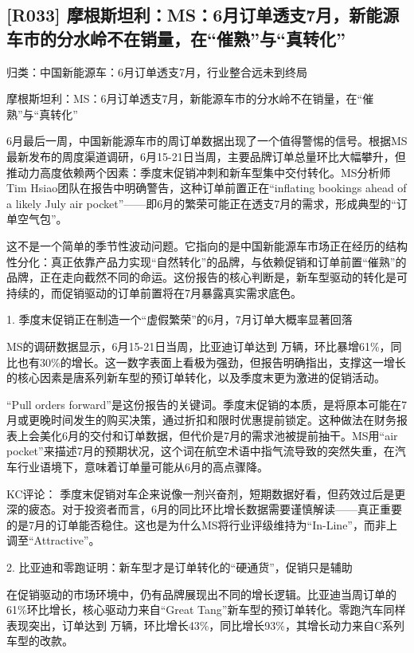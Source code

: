 \documentclass[11pt]{ctexart}
\begin{document}
\subsection{[R033] 摩根斯坦利：MS：6月订单透支7月，新能源车市的分水岭不在销量，在“催熟”与“真转化”}
{\small\color{refgray}归类：中国新能源车：6月订单透支7月，行业整合远未到终局}

摩根斯坦利：MS：6月订单透支7月，新能源车市的分水岭不在销量，在“催熟”与“真转化”

6月最后一周，中国新能源车市的周订单数据出现了一个值得警惕的信号。根据MS最新发布的周度渠道调研，6月15-21日当周，主要品牌订单总量环比大幅攀升，但推动力高度依赖两个因素：季度末促销冲刺和新车型集中交付转化。MS分析师Tim Hsiao团队在报告中明确警告，这种订单前置正在“inflating bookings ahead of a likely July air pocket”——即6月的繁荣可能正在透支7月的需求，形成典型的“订单空气包”。

这不是一个简单的季节性波动问题。它指向的是中国新能源车市场正在经历的结构性分化：真正依靠产品力实现“自然转化”的品牌，与依赖促销和订单前置“催熟”的品牌，正在走向截然不同的命运。这份报告的核心判断是，新车型驱动的转化是可持续的，而促销驱动的订单前置将在7月暴露真实需求底色。

1. 季度末促销正在制造一个“虚假繁荣”的6月，7月订单大概率显著回落

MS的调研数据显示，6月15-21日当周，比亚迪订单达到 万辆，环比暴增61\%，同比也有30\%的增长。这一数字表面上看极为强劲，但报告明确指出，支撑这一增长的核心因素是唐系列新车型的预订单转化，以及季度末更为激进的促销活动。

“Pull orders forward”是这份报告的关键词。季度末促销的本质，是将原本可能在7月或更晚时间发生的购买决策，通过折扣和限时优惠提前锁定。这种做法在财务报表上会美化6月的交付和订单数据，但代价是7月的需求池被提前抽干。MS用“air pocket”来描述7月的预期状况，这个词在航空术语中指气流导致的突然失重，在汽车行业语境下，意味着订单量可能从6月的高点骤降。

KC评论： 季度末促销对车企来说像一剂兴奋剂，短期数据好看，但药效过后是更深的疲态。对于投资者而言，6月的同比环比增长数据需要谨慎解读——真正重要的是7月的订单能否稳住。这也是为什么MS将行业评级维持为“In-Line”，而非上调至“Attractive”。

2. 比亚迪和零跑证明：新车型才是订单转化的“硬通货”，促销只是辅助

在促销驱动的市场环境中，仍有品牌展现出不同的增长逻辑。比亚迪当周订单的61\%环比增长，核心驱动力来自“Great Tang”新车型的预订单转化。零跑汽车同样表现突出，订单达到 万辆，环比增长43\%，同比增长93\%，其增长动力来自C系列车型的改款。
\end{document}
